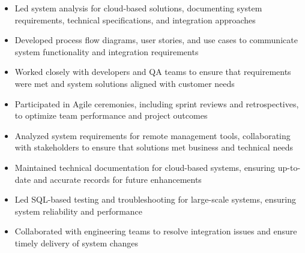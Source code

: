\par\smallskip
\begin{minipage}{13.75cm}
  \begin{minipage}{6.5cm}
    \begin{itemize}
      \item Led system analysis for cloud-based solutions, documenting system requirements, technical specifications, and integration approaches
      \item Developed process flow diagrams, user stories, and use cases to communicate system functionality and integration requirements
    \end{itemize}
  \end{minipage}
  \hfill
  \begin{minipage}{6.5cm}
    \begin{itemize}
      \item Worked closely with developers and QA teams to ensure that requirements were met and system solutions aligned with customer needs
      \item Participated in Agile ceremonies, including sprint reviews and retrospectives, to optimize team performance and project outcomes
    \end{itemize}
  \end{minipage}
\end{minipage}
\par\smallskip
\divider

\par\smallskip
\begin{minipage}{13.75cm}
  \begin{minipage}{6.5cm}
    \begin{itemize}
      \item Analyzed system requirements for remote management tools, collaborating with stakeholders to ensure that solutions met business and technical needs
      \item Maintained technical documentation for cloud-based systems, ensuring up-to-date and accurate records for future enhancements
    \end{itemize}
  \end{minipage}
  \hfill
  \begin{minipage}{6.5cm}
    \begin{itemize}
      \item Led SQL-based testing and troubleshooting for large-scale systems, ensuring system reliability and performance
      \item Collaborated with engineering teams to resolve integration issues and ensure timely delivery of system changes
    \end{itemize}
  \end{minipage}
\end{minipage}

